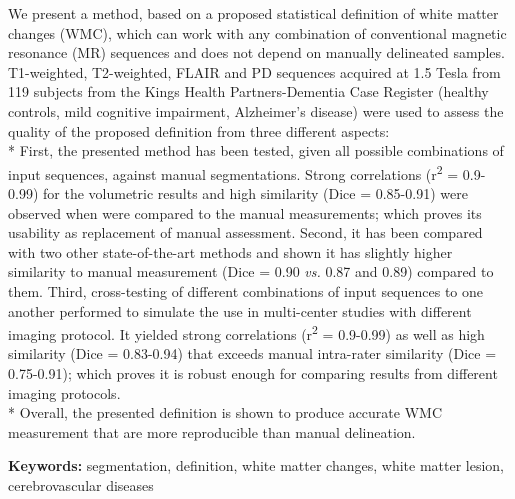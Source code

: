 We present a method, based on a proposed statistical definition of white matter changes (WMC), which can work with any combination of conventional magnetic resonance (MR) sequences and does not depend on manually delineated samples. T1-weighted, T2-weighted, FLAIR and PD sequences acquired at 1.5 Tesla from 119 subjects from the Kings Health Partners-Dementia Case Register (healthy controls, mild cognitive impairment, Alzheimer’s disease) were used to assess the quality of the proposed definition from three different aspects:
\\*
First, the presented method has been tested, given all possible combinations of input sequences, against manual segmentations. Strong correlations (r\textsuperscript{2} = 0.9-0.99) for the volumetric results and high similarity (Dice = 0.85-0.91) were observed when were compared to the manual measurements; which proves its usability as replacement of manual assessment.
Second, it has been compared with two other state-of-the-art methods and shown it has slightly higher similarity to manual measurement (Dice = 0.90 \textit{vs.} 0.87 and 0.89) compared to them.
Third, cross-testing of different combinations of input sequences to one another performed to simulate the use in multi-center studies with different imaging protocol. It yielded strong correlations (r\textsuperscript{2} = 0.9-0.99) as well as high similarity (Dice = 0.83-0.94) that exceeds manual intra-rater similarity (Dice = 0.75-0.91); which proves it is robust enough for comparing results from different imaging protocols.
\\*
Overall, the presented definition is shown to produce accurate WMC measurement that are more reproducible than manual delineation.

\textbf{Keywords:} segmentation, definition, white matter changes, white matter lesion, cerebrovascular diseases

  
  
  
  
  
  
  
  
  
  
  